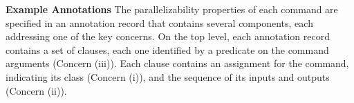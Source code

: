 \documentclass[sigplan, review, screen, anonymous]{acmart}
\newcommand{\heading}[1]{\vspace{4pt}\noindent\textbf{#1}\enspace}
\newcommand{\ttt}[1]{\texttt{#1}}
\newcommand{\cn}[1]{\mbox{\textcircled{\footnotesize #1}}}
\newcommand{\sta}{\cn{\textsc{S}}\xspace}
\newcommand{\pur}{\cn{\textsc{P}}\xspace}
\newcommand{\nv}[1]{[{\color{cyan}nv: #1}]}
\newcommand{\kk}[1]{[{\color{magenta}kk: #1}]}
\newcommand{\str}{{\color{red}\textbf{\ttt{*}}}}
\begin{document}



\heading{Example Annotations}
The parallelizability properties of each command are specified in an annotation record that contains several components, each addressing one of the key concerns.
On the top level, each annotation record contains a set of clauses, each one identified by a predicate on the command arguments (Concern (iii)). 
Each clause contains an assignment for the command, indicating its class (Concern (i)), and the sequence of its inputs and outputs (Concern (ii)).
\end{document}
